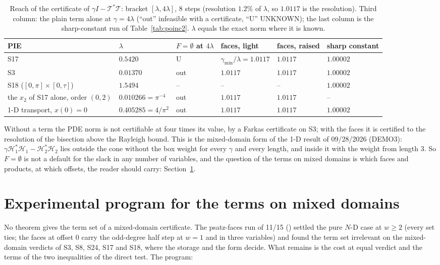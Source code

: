 \documentclass[12pt]{article}
\newcommand{\mcl}[1]{\mathcal{#1}}
\newcommand{\file}[1]{\path{#1}}      %
\theoremstyle{plain}
\theoremstyle{definition}
\theoremstyle{remark}
\begin{document}
\begin{table}[h]\centering\scriptsize
\setlength{\tabcolsep}{4pt}
\begin{tabular}{llllll}
\toprule
PIE & $\lambda$ & $F=\emptyset$ at $4\lambda$ & faces, light & faces, raised & sharp constant \\
\midrule
S17 & $0.5420$ & U & $\gamma_{\min}/\lambda=1.0117$ & $1.0117$ & $1.00002$ \\
S3 & $0.01370$ & out & $1.0117$ & $1.0117$ & $1.00002$ \\
S18 ($[0,\pi]\times[0,\tau]$) & $1.5494$ & -- & -- & -- & $1.00002$ \\
the $x_2$ of S17 alone, order $(0,2)$ & $0.010266=\pi^{-4}$ & out & $1.0117$ & $1.0117$ & -- \\
1-D transport, $x(0)=0$ & $0.405285=4/\pi^2$ & out & $1.0117$ & $1.0117$ & $1.00002$ \\
\bottomrule
\end{tabular}
\caption{Reach of the certificate of $\gamma I-\mcl T^*\mcl T$: bracket $[\lambda,4\lambda]$, 8 steps (resolution $1.2\%$ of $\lambda$, so $1.0117$ is the resolution). Third column: the plain term alone at $\gamma=4\lambda$ (``out'' infeasible with a certificate, ``U'' UNKNOWN); the last column is the sharp-constant run of Table~\ref{tab:poinc2}. $\lambda$ equals the exact norm where it is known.}\label{tab:poinc}
\end{table}

Without a term the PDE norm is not certifiable at four times its value, by a Farkas certificate on S3; with the faces it is certified to the resolution of the bisection above the Rayleigh bound. This is the mixed-domain form of the 1-D result of 09/28/2026 (DEMO3): $\gamma\mcl H_1^*\mcl H_1-\mcl H_2^*\mcl H_2$ lies outside the cone without the box weight for every $\gamma$ and every length, and inside it with the weight from length $3$. So $F=\emptyset$ is not a default for the slack in any number of variables, and the question of the terms on mixed domains is which faces and products, at which offsets, the reader should carry: Section~\ref{sec:program}.

\section{Experimental program for the terms on mixed domains}\label{sec:program}

No theorem gives the term set of a mixed-domain certificate. The psatz-faces run of 11/15 (\file{sopvar/psatz_faces_results/SUMMARY.md}) settled the pure $N$-D case at $w\ge2$ (every set ties; the faces at offset $0$ carry the odd-degree half step at $w=1$ and in three variables) and found the term set irrelevant on the mixed-domain verdicts of S3, S8, S24, S17 and S18, where the storage and the form decide. What remains is the cost at equal verdict and the terms of the two inequalities of the direct test. The program:
\end{document}
